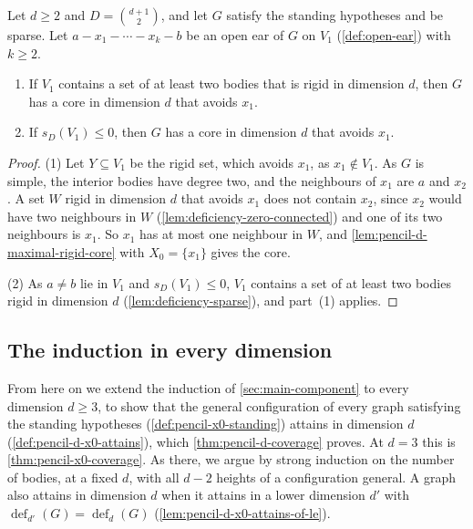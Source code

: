 \begin{lemma}
  \label{lem:pencil-d-chain-core}
  \leanok
  Let $d \ge 2$ and $D = \binom{d+1}{2}$, and let $G$ satisfy the
  standing hypotheses and be sparse. Let
  $a - x_1 - \cdots - x_k - b$ be an open ear of $G$ on $V_1$
  (\cref{def:open-ear}) with $k \ge 2$.
  \begin{enumerate}
    \item If $V_1$ contains a set of at least two bodies that is rigid in
      dimension $d$, then $G$ has a core in dimension $d$ that avoids
      $x_1$.
    \item If $s_D(V_1) \le 0$, then $G$ has a core in dimension $d$ that
      avoids $x_1$.
  \end{enumerate}
\end{lemma}
\begin{proof}
  \leanok
  (1) Let $Y \subseteq V_1$ be the rigid set, which avoids $x_1$, as
  $x_1 \notin V_1$. As $G$ is simple, the interior bodies have degree
  two, and the neighbours of $x_1$ are $a$ and $x_2$. A set $W$ rigid in
  dimension $d$ that avoids $x_1$ does not contain $x_2$, since $x_2$
  would have two neighbours in $W$ (\cref{lem:deficiency-zero-connected})
  and one of its two neighbours is $x_1$. So $x_1$ has at most one
  neighbour in $W$, and \cref{lem:pencil-d-maximal-rigid-core} with
  $X_0 = \{x_1\}$ gives the core.

  (2) As $a \neq b$ lie in $V_1$ and $s_D(V_1) \le 0$, $V_1$ contains a
  set of at least two bodies rigid in dimension $d$
  (\cref{lem:deficiency-sparse}), and part~(1) applies.
\end{proof}

\subsection{The induction in every dimension}
\label{sec:pencil-d-induction}

From here on we extend the induction of \cref{sec:main-component} to
every dimension $d \ge 3$, to show that the general configuration of
every graph satisfying the standing hypotheses
(\cref{def:pencil-x0-standing}) attains in dimension $d$
(\cref{def:pencil-d-x0-attains}), which \cref{thm:pencil-d-coverage}
proves. At $d = 3$ this is \cref{thm:pencil-x0-coverage}. As there, we argue by strong induction on
the number of bodies, at a fixed $d$, with all $d - 2$ heights of a
configuration general. A graph also attains in dimension $d$ when it
attains in a lower dimension $d'$ with
$\operatorname{def}_{d'}(G) = \operatorname{def}_d(G)$
(\cref{lem:pencil-d-x0-attains-of-le}).

